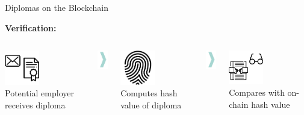 \documentclass[handout]{beamer}
\begin{document}
\begin{frame}{Diplomas on the Blockchain}
\begin{minipage}{\linewidth}
	\end{minipage}\vfill
	\vspace{0.5cm}
	\begin{minipage}{\linewidth}
	\textbf{\large{Verification:}}
	\begin{columns}
		\begin{column}{0.3\textwidth}
			\centering
			\includegraphics[width=1.5cm]{../assets/images/receive_diploma.png}\\
			Potential employer receives diploma
		\end{column}
		\begin{column}{0.05\textwidth}
			\includegraphics[width=0.75cm]{../assets/images/big_arrow.png}
		\end{column}
		\begin{column}{0.3\textwidth}
			\centering
			\includegraphics[width=1.5cm]{../assets/images/fingerprint.png}\\
			Computes hash value of diploma
		\end{column}
		\begin{column}{0.05\textwidth}
			\includegraphics[width=0.75cm]{../assets/images/big_arrow.png}
		\end{column}
		\begin{column}{0.3\textwidth}
			\centering
			\includegraphics[width=1.5cm]{../assets/images/verify_onchain.png}\\
			Compares with on-chain hash value
		\end{column}
	\end{columns}
\end{minipage}
\end{frame}
\end{document}
